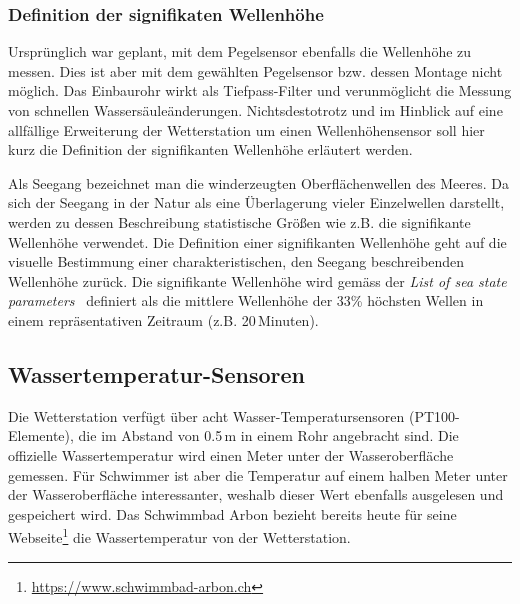 \subsubsection{Definition der signifikaten Wellenhöhe}
Ursprünglich war geplant, mit dem Pegelsensor ebenfalls die Wellenhöhe zu messen. Dies ist aber mit dem gewählten Pegelsensor bzw. dessen Montage nicht möglich. Das Einbaurohr wirkt als Tiefpass-Filter und verunmöglicht die Messung von schnellen Wassersäuleänderungen. Nichtsdestotrotz und im Hinblick auf eine allfällige Erweiterung der Wetterstation um einen Wellenhöhensensor soll hier kurz die Definition der signifikanten Wellenhöhe erläutert werden.

Als Seegang bezeichnet man die winderzeugten Oberflächenwellen des Meeres. Da sich der Seegang in der Natur als eine Überlagerung vieler Einzelwellen darstellt, werden zu dessen Beschreibung statistische Größen wie z.B. die signifikante Wellenhöhe verwendet. Die Definition einer signifikanten Wellenhöhe geht auf die visuelle Bestimmung einer charakteristischen, den Seegang beschreibenden Wellenhöhe zurück. Die signifikante Wellenhöhe wird gemäss der \emph{List of sea state parameters}~\cite{1986Iahr} definiert als die mittlere Wellenhöhe der 33\% höchsten Wellen in einem repräsentativen Zeitraum (z.B. 20\,Minuten).

\subsection{Wassertemperatur-Sensoren}
Die Wetterstation verfügt über acht Wasser-Temperatursensoren (PT100-Elemente), die im Abstand von 0.5\,m in einem Rohr angebracht sind. Die offizielle Wassertemperatur wird einen Meter unter der Wasseroberfläche gemessen. Für Schwimmer ist aber die Temperatur auf einem halben Meter unter der Wasseroberfläche interessanter, weshalb dieser Wert ebenfalls ausgelesen und gespeichert wird. Das Schwimmbad Arbon bezieht bereits heute für seine Webseite\footnote{ \url{https://www.schwimmbad-arbon.ch}} die Wassertemperatur von der Wetterstation.

